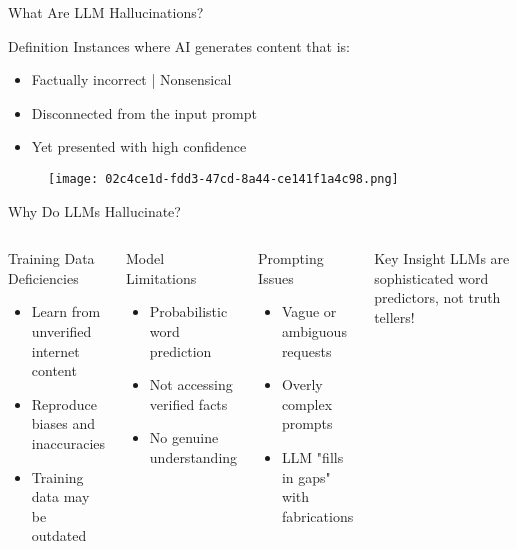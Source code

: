 \documentclass{beamer}
\begin{document}
\begin{frame}{What Are LLM Hallucinations?}
\begin{block}{Definition}
Instances where AI generates content that is:
\begin{itemize}
  \item Factually incorrect | Nonsensical
  \item Disconnected from the input prompt
  \item Yet presented with high confidence
\end{itemize}
\end{block}

\alert{}
\begin{figure}
    \centering
    \texttt{[image: 02c4ce1d-fdd3-47cd-8a44-ce141f1a4c98.png]}
\end{figure}
\end{frame}

\begin{frame}{Why Do LLMs Hallucinate?}
\begin{columns}
\begin{block}{Training Data Deficiencies}
\begin{itemize}
  \item Learn from unverified internet content
  \item Reproduce biases and inaccuracies
  \item Training data may be outdated
\end{itemize}
\end{block}

\pause

\begin{block}{Model Limitations}
\begin{itemize}
  \item Probabilistic word prediction
  \item Not accessing verified facts
  \item No genuine understanding
\end{itemize}
\end{block}

\pause

\begin{block}{Prompting Issues}
\begin{itemize}
  \item Vague or ambiguous requests
  \item Overly complex prompts
  \item LLM "fills in gaps" with fabrications
\end{itemize}
\end{block}

\pause

\begin{alertblock}{Key Insight}
LLMs are sophisticated word predictors, not truth tellers!
\end{alertblock}
\end{columns}
\end{frame}
\end{document}
